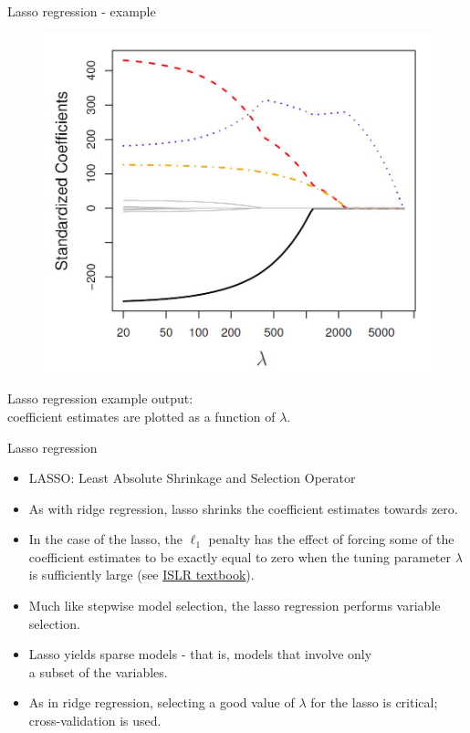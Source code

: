 \documentclass{beamer}
\begin{document}
\begin{frame}{Lasso regression - example}
\vspace{-1cm}
\begin{figure}
\includegraphics[scale=0.30]{IMG/Lasso.jpg}
\end{figure}
\vspace{-0.5cm}
\centering Lasso regression example output: \\coefficient estimates are plotted as a function of $\lambda$.
\end{frame}
\begin{frame}{Lasso regression}

\begin{itemize}
\item LASSO: Least Absolute Shrinkage and Selection Operator
\medskip
\item As with ridge regression, lasso shrinks the coefficient
estimates towards zero.
\medskip
\item In the case of the lasso, the $\ell_1$ penalty has the
effect of forcing some of the coefficient estimates to be
exactly equal to zero when the tuning parameter $\lambda$ is
sufficiently large (see \textcolor{blue}{\underline{\href{http://www-bcf.usc.edu/~gareth/ISL/}{ISLR textbook}}}).
\medskip
\item Much like stepwise model selection, the lasso regression performs variable selection.
\medskip
\item Lasso yields sparse models - that is, models that involve only \\a subset of the variables.
\medskip
\item As in ridge regression, selecting a good value of $\lambda$ for the
lasso is critical; cross-validation is used.
\end{itemize}
\end{frame}
\end{document}
